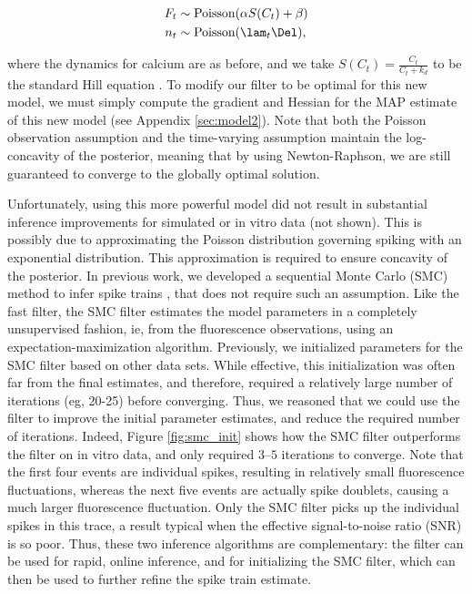 \begin{align}
	F_t &\sim \text{Poisson}(\alpha S(C_t) + \beta) \label{eq:nonlin} \\
	n_t &\sim \text{Poisson}(\lam_t \Del),
\end{align}

\noindent where the dynamics for calcium are as before, and we take $S(C_t)=\frac{C_t}{C_t + k_d}$ to be the standard Hill equation \cite{PologrutoSvoboda04}.  To modify our \foopsi filter to be optimal for this new model, we must simply compute the gradient and Hessian for the MAP estimate of this new model (see Appendix \ref{sec:model2}).  Note that both the Poisson observation assumption and the time-varying assumption maintain the log-concavity of the posterior, meaning that by using Newton-Raphson, we are still guaranteed to converge to the globally optimal solution.   

Unfortunately, using this more powerful model did not result in substantial inference improvements for simulated or in vitro data (not shown).  This is possibly due to approximating the Poisson distribution governing spiking with an exponential distribution.  This approximation is required to ensure concavity of the posterior.  In previous work, we developed a sequential Monte Carlo (SMC) method to infer spike trains \cite{VogelsteinPaninski09}, that does not require such an assumption. Like the fast filter, the SMC filter estimates the model parameters in a completely unsupervised fashion, ie, from the fluorescence observations, using an expectation-maximization algorithm.  Previously, we initialized parameters for the SMC filter based on other data sets.  While effective, this initialization was often far from the final estimates, and therefore, required a relatively large number of iterations (eg, 20-25) before converging.  Thus, we reasoned that we could use the \foopsi filter to improve the initial parameter estimates, and reduce the required number of iterations.  Indeed, Figure \ref{fig:smc_init} shows how the SMC filter outperforms the \foopsi filter on in vitro data, and only required $3$--$5$ iterations to converge.  Note that the first four events are individual spikes, resulting in relatively small fluorescence fluctuations, whereas the next five events are actually spike doublets, causing a much larger fluorescence fluctuation.  Only the SMC filter picks up the individual spikes in this trace, a result typical when the effective signal-to-noise ratio (SNR) is so poor.  Thus, these two inference algorithms are complementary: the \foopsi filter can be used for rapid, online inference, and for initializing the SMC filter, which can then be used to further refine the spike train estimate.

